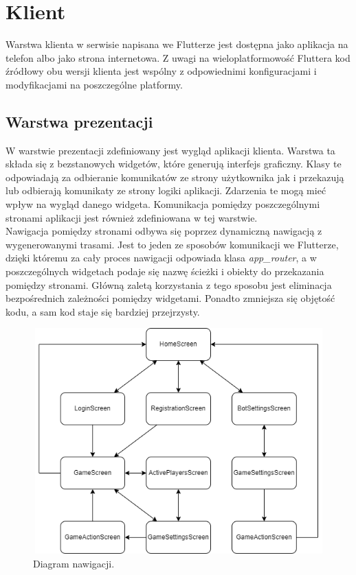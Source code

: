 \section{Klient}

Warstwa klienta w serwisie napisana we Flutterze jest dostępna jako aplikacja na telefon albo jako strona internetowa. Z uwagi na wieloplatformowość Fluttera kod źródłowy obu wersji klienta jest wspólny z odpowiednimi konfiguracjami i modyfikacjami na poszczególne platformy.

\subsection{Warstwa prezentacji}

W warstwie prezentacji zdefiniowany jest wygląd aplikacji klienta. Warstwa ta składa się z bezstanowych widgetów, które generują interfejs graficzny. Klasy te odpowiadają za odbieranie
komunikatów ze strony użytkownika jak i przekazują lub odbierają komunikaty ze strony logiki aplikacji. Zdarzenia te mogą mieć wpływ na wygląd danego widgeta. Komunikacja pomiędzy poszczególnymi stronami aplikacji jest również zdefiniowana w tej warstwie. \\

Nawigacja pomiędzy stronami odbywa się poprzez dynamiczną nawigacją z wygenerowanymi trasami. Jest to jeden ze sposobów komunikacji we Flutterze, dzięki któremu za cały proces nawigacji odpowiada klasa \emph{app\_router}, a w poszczególnych widgetach podaje się nazwę ścieżki i obiekty do przekazania pomiędzy stronami. Główną zaletą korzystania z tego sposobu jest eliminacja bezpośrednich zależności pomiędzy widgetami. Ponadto zmniejsza się objętość kodu, a sam kod staje się bardziej przejrzysty. \\

\begin{figure}[h!]
	\begin{center}
		\includegraphics[width=12cm,height=8.7cm]{img/nawigacja.png}
	\end{center}
	\caption{{\color{dgray}Diagram nawigacji.}} 
	\label{nawigacja}
\end{figure}  

